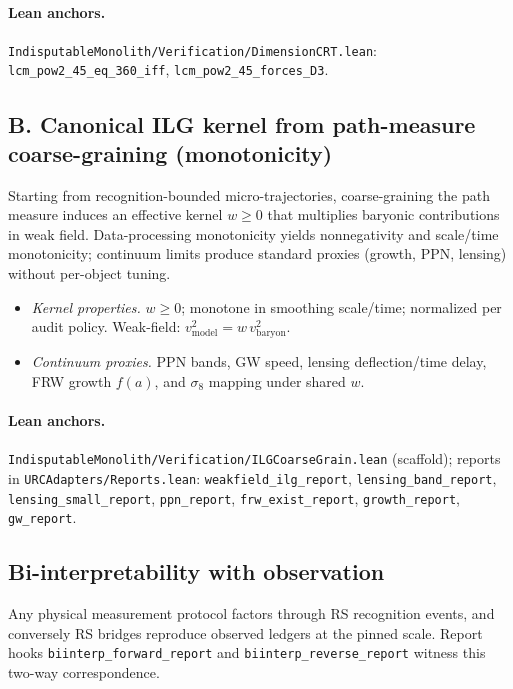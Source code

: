 \documentclass[11pt]{article}
\begin{document}
\paragraph{Lean anchors.} \texttt{IndisputableMonolith/Verification/DimensionCRT.lean}: \texttt{lcm\_pow2\_45\_eq\_360\_iff}, \texttt{lcm\_pow2\_45\_forces\_D3}.

\subsection*{B. Canonical ILG kernel from path\mbox{-}measure coarse\mbox{-}graining (monotonicity)}
Starting from recognition\mbox{-}bounded micro\mbox{-}trajectories, coarse\mbox{-}graining the path measure induces an effective kernel \(w\ge 0\) that multiplies baryonic contributions in weak field. Data\mbox{-}processing monotonicity yields nonnegativity and scale/time monotonicity; continuum limits produce standard proxies (growth, PPN, lensing) without per\mbox{-}object tuning.
\begin{itemize}
  \item \emph{Kernel properties.} \(w\ge 0\); monotone in smoothing scale/time; normalized per audit policy. Weak\mbox{-}field: \(v^2_{\mathrm{model}}=w\,v^2_{\mathrm{baryon}}\).
  \item \emph{Continuum proxies.} PPN bands, GW speed, lensing deflection/time delay, FRW growth \(f(a)\), and \(\sigma_8\) mapping under shared \(w\).
\end{itemize}

\paragraph{Lean anchors.} \texttt{IndisputableMonolith/Verification/ILGCoarseGrain.lean} (scaffold); reports in \texttt{URCAdapters/Reports.lean}: \texttt{weakfield\_ilg\_report}, \texttt{lensing\_band\_report}, \texttt{lensing\_small\_report}, \texttt{ppn\_report}, \texttt{frw\_exist\_report}, \texttt{growth\_report}, \texttt{gw\_report}.

\subsection{Bi\mbox{-}interpretability with observation}\label{subsec:biinterp}
Any physical measurement protocol factors through RS recognition events, and conversely RS bridges reproduce observed ledgers at the pinned scale. Report hooks \texttt{biinterp\_forward\_report} and \texttt{biinterp\_reverse\_report} witness this two\mbox{-}way correspondence.
\end{document}
